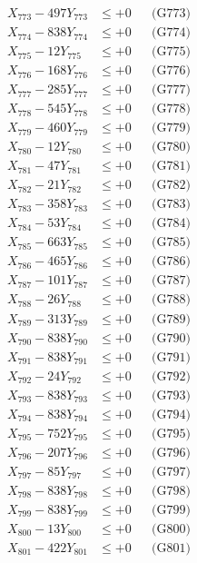 \documentclass[a4paper,10pt]{article}
\begin{document}
{\begin{align}
X_{773} - 497Y_{773} &\leq +0 && \text{(G773)} \\
X_{774} - 838Y_{774} &\leq +0 && \text{(G774)} \\
X_{775} - 12Y_{775} &\leq +0 && \text{(G775)} \\
X_{776} - 168Y_{776} &\leq +0 && \text{(G776)} \\
X_{777} - 285Y_{777} &\leq +0 && \text{(G777)} \\
X_{778} - 545Y_{778} &\leq +0 && \text{(G778)} \\
X_{779} - 460Y_{779} &\leq +0 && \text{(G779)} \\
X_{780} - 12Y_{780} &\leq +0 && \text{(G780)} \\
\allowbreak
X_{781} - 47Y_{781} &\leq +0 && \text{(G781)} \\
X_{782} - 21Y_{782} &\leq +0 && \text{(G782)} \\
X_{783} - 358Y_{783} &\leq +0 && \text{(G783)} \\
X_{784} - 53Y_{784} &\leq +0 && \text{(G784)} \\
X_{785} - 663Y_{785} &\leq +0 && \text{(G785)} \\
X_{786} - 465Y_{786} &\leq +0 && \text{(G786)} \\
X_{787} - 101Y_{787} &\leq +0 && \text{(G787)} \\
X_{788} - 26Y_{788} &\leq +0 && \text{(G788)} \\
X_{789} - 313Y_{789} &\leq +0 && \text{(G789)} \\
X_{790} - 838Y_{790} &\leq +0 && \text{(G790)} \\
\allowbreak
X_{791} - 838Y_{791} &\leq +0 && \text{(G791)} \\
X_{792} - 24Y_{792} &\leq +0 && \text{(G792)} \\
X_{793} - 838Y_{793} &\leq +0 && \text{(G793)} \\
X_{794} - 838Y_{794} &\leq +0 && \text{(G794)} \\
X_{795} - 752Y_{795} &\leq +0 && \text{(G795)} \\
X_{796} - 207Y_{796} &\leq +0 && \text{(G796)} \\
X_{797} - 85Y_{797} &\leq +0 && \text{(G797)} \\
X_{798} - 838Y_{798} &\leq +0 && \text{(G798)} \\
X_{799} - 838Y_{799} &\leq +0 && \text{(G799)} \\
X_{800} - 13Y_{800} &\leq +0 && \text{(G800)} \\
\allowbreak
X_{801} - 422Y_{801} &\leq +0 && \text{(G801)} \\

\end{align}}
\end{document}
